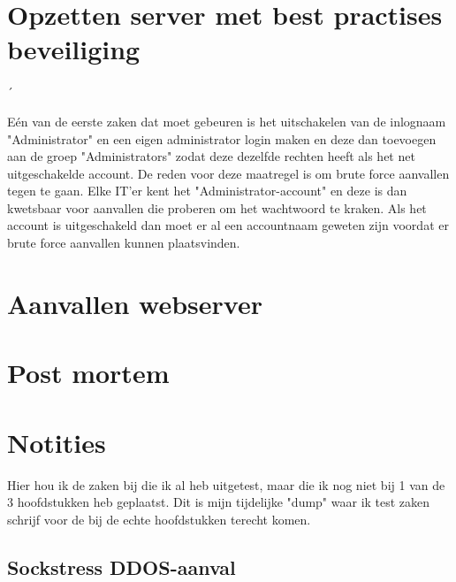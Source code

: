 \documentclass[pdftex,a4paper,12pt]{report}
\begin{document}
\chapter{Opzetten server met best practises beveiliging}
´%

Eén van de eerste zaken dat moet gebeuren is het uitschakelen van de inlognaam "Administrator" en een eigen administrator login maken en deze dan toevoegen aan de groep "Administrators" zodat deze dezelfde rechten heeft als het net uitgeschakelde account. De reden voor deze maatregel is om brute force aanvallen tegen te gaan. Elke IT'er kent het "Administrator-account" en deze is dan kwetsbaar voor aanvallen die proberen om het wachtwoord te kraken. Als het account is uitgeschakeld dan moet er al een accountnaam geweten zijn voordat er brute force aanvallen kunnen plaatsvinden.

\chapter{Aanvallen webserver}

\chapter{Post mortem}


\chapter{Notities}
Hier hou ik de zaken bij die ik al heb uitgetest, maar die ik nog niet bij 1 van de 3 hoofdstukken heb geplaatst. Dit is mijn tijdelijke "dump" waar ik test zaken schrijf voor de bij de echte hoofdstukken terecht komen.
\newpage
\section{Sockstress DDOS-aanval}
\end{document}
